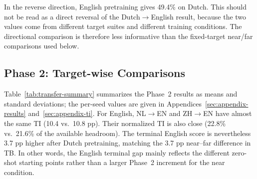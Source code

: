 \documentclass[11pt]{article}
\begin{document}
In the reverse direction, English pretraining gives 49.4\% on Dutch. This should not be read as a direct reversal of the Dutch$\rightarrow$English result, because the two values come from different target suites and different training conditions. The directional comparison is therefore less informative than the fixed-target near/far comparisons used below.

\subsection{Phase 2: Target-wise Comparisons}

Table~\ref{tab:transfer-summary} summarizes the Phase~2 results as means and standard deviations; the per-seed values are given in Appendices~\ref{sec:appendix-results} and~\ref{sec:appendix-ti}. For English, NL$\rightarrow$EN and ZH$\rightarrow$EN have almost the same TI (10.4 vs.\ 10.8 pp). Their normalized TI is also close (22.8\% vs.\ 21.6\% of the available headroom). The terminal English score is nevertheless 3.7 pp higher after Dutch pretraining, matching the 3.7 pp near--far difference in TB. In other words, the English terminal gap mainly reflects the different zero-shot starting points rather than a larger Phase~2 increment for the near condition.

\begin{table}[tb]
\centering
\small
{}
\caption{Target-wise transfer summary across five seeds (mean $\pm$ sample SD). TI and TB are percentage-point differences, while nTI is the percentage of available accuracy headroom recovered during Phase~2. Near/far comparisons are made within each target block.}
\label{tab:transfer-summary}
\end{table}
\end{document}

